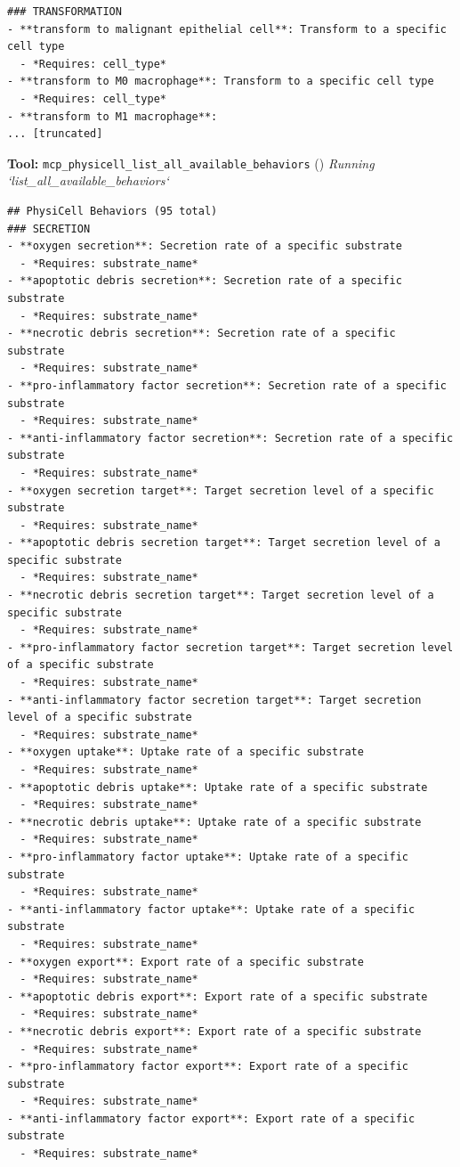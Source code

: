 \documentclass[11pt,a4paper]{article}
\begin{document}
\begin{toolokbox}
\begin{lstlisting}
### TRANSFORMATION
- **transform to malignant epithelial cell**: Transform to a specific cell type
  - *Requires: cell_type*
- **transform to M0 macrophage**: Transform to a specific cell type
  - *Requires: cell_type*
- **transform to M1 macrophage**:
... [truncated]
\end{lstlisting}
\end{toolokbox}
\begin{toolokbox}
\textbf{Tool:} \texttt{mcp\_physicell\_list\_all\_available\_behaviors} (\checkmark)
\textit{Running `list\_all\_available\_behaviors`}
\begin{lstlisting}
## PhysiCell Behaviors (95 total)
### SECRETION
- **oxygen secretion**: Secretion rate of a specific substrate
  - *Requires: substrate_name*
- **apoptotic debris secretion**: Secretion rate of a specific substrate
  - *Requires: substrate_name*
- **necrotic debris secretion**: Secretion rate of a specific substrate
  - *Requires: substrate_name*
- **pro-inflammatory factor secretion**: Secretion rate of a specific substrate
  - *Requires: substrate_name*
- **anti-inflammatory factor secretion**: Secretion rate of a specific substrate
  - *Requires: substrate_name*
- **oxygen secretion target**: Target secretion level of a specific substrate
  - *Requires: substrate_name*
- **apoptotic debris secretion target**: Target secretion level of a specific substrate
  - *Requires: substrate_name*
- **necrotic debris secretion target**: Target secretion level of a specific substrate
  - *Requires: substrate_name*
- **pro-inflammatory factor secretion target**: Target secretion level of a specific substrate
  - *Requires: substrate_name*
- **anti-inflammatory factor secretion target**: Target secretion level of a specific substrate
  - *Requires: substrate_name*
- **oxygen uptake**: Uptake rate of a specific substrate
  - *Requires: substrate_name*
- **apoptotic debris uptake**: Uptake rate of a specific substrate
  - *Requires: substrate_name*
- **necrotic debris uptake**: Uptake rate of a specific substrate
  - *Requires: substrate_name*
- **pro-inflammatory factor uptake**: Uptake rate of a specific substrate
  - *Requires: substrate_name*
- **anti-inflammatory factor uptake**: Uptake rate of a specific substrate
  - *Requires: substrate_name*
- **oxygen export**: Export rate of a specific substrate
  - *Requires: substrate_name*
- **apoptotic debris export**: Export rate of a specific substrate
  - *Requires: substrate_name*
- **necrotic debris export**: Export rate of a specific substrate
  - *Requires: substrate_name*
- **pro-inflammatory factor export**: Export rate of a specific substrate
  - *Requires: substrate_name*
- **anti-inflammatory factor export**: Export rate of a specific substrate
  - *Requires: substrate_name*


\end{lstlisting}
\end{toolokbox}
\end{document}
